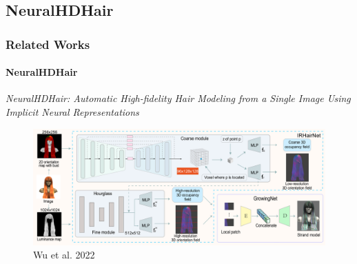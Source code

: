 \subsection{NeuralHDHair}
\begin{frame}\frametitle{Related Works}
    \framesubtitle{NeuralHDHair}

    \normalsize{\textcolor{myBlue}{\textit{NeuralHDHair: Automatic High-fidelity Hair Modeling from a Single Image Using Implicit Neural Representations}}}
    
    \begin{figure}[ht]
        \centering
        \includegraphics[width=0.8\linewidth]{assets/figures/baselines/NeuralHDHair.png}
        \caption{Wu et al. 2022\cite{wu2022neuralhdhair}}
        \label{fig:neuralhdhair}
    \end{figure}
\end{frame}

